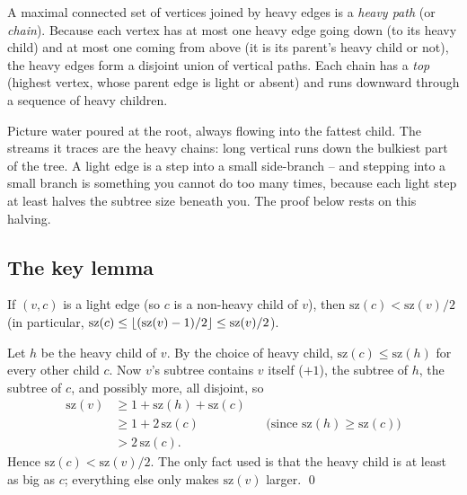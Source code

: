 \begin{definition}
\label{ch19:def-chain}
A maximal connected set of vertices joined by heavy edges is a \emph{heavy path} (or \emph{chain}).
Because each vertex has at most one heavy edge going down (to its heavy child) and at most one coming
from above (it is its parent's heavy child or not), the heavy edges form a disjoint union of vertical
paths. Each chain has a \emph{top} (highest vertex, whose parent edge is light or absent) and runs
downward through a sequence of heavy children.
\end{definition}

\begin{intuitionbox}
Picture water poured at the root, always flowing into the fattest child. The streams it traces are
the heavy chains: long vertical runs down the bulkiest part of the tree. A light edge is a step into a
small side-branch -- and stepping into a small branch is something you cannot do too many times,
because each light step at least halves the subtree size beneath you. The proof below rests on
this halving.
\end{intuitionbox}

\subsection{The key lemma}

\begin{lemma}
\label{ch19:lem-halve}
If $(v,c)$ is a light edge (so $c$ is a non-heavy child of $v$), then
$\mathrm{sz}(c) < \mathrm{sz}(v)/2$ (in particular, $\mathrm{sz}(c) \le \lfloor(\mathrm{sz}(v)-1)/2\rfloor \le \mathrm{sz}(v)/2$).
\end{lemma}

\begin{whybox}
Let $h$ be the heavy child of $v$. By the choice of heavy child, $\mathrm{sz}(c)\le\mathrm{sz}(h)$
for every other child $c$. Now $v$'s subtree contains $v$ itself ($+1$), the subtree of $h$, the subtree of $c$, and
possibly more, all disjoint, so
\begin{align*}
  \mathrm{sz}(v) &\ge 1 + \mathrm{sz}(h) + \mathrm{sz}(c) \\
  &\ge 1 + 2\,\mathrm{sz}(c) && \text{(since $\mathrm{sz}(h) \ge \mathrm{sz}(c)$)} \\
  &> 2\,\mathrm{sz}(c).
\end{align*}
Hence $\mathrm{sz}(c) < \mathrm{sz}(v)/2$. The only fact used is that the heavy child is at least as
big as $c$; everything else only makes $\mathrm{sz}(v)$ larger. \qed
\end{whybox}

